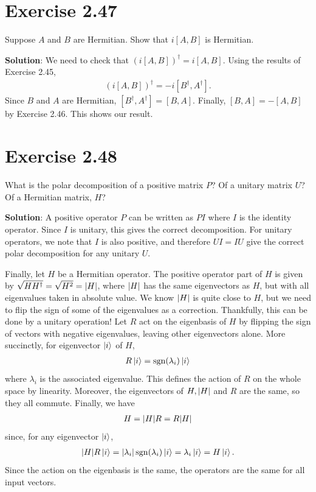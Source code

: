 \documentclass{book}
\begin{document}
\section*{Exercise 2.47}
    Suppose $A$ and $B$ are Hermitian. Show that $i[A, B]$ is Hermitian.
    
    \textbf{Solution}: We need to check that $(i[A,B])^\dagger = i[A,B]$. Using the results of Exercise 2.45,
    \begin{align}
        (i[A,B])^\dagger = -i [B^\dagger, A^\dagger].
    \end{align}
    Since $B$ and $A$ are Hermitian, $[B^\dagger, A^\dagger] = [B,A]$. Finally, $[B,A] = -[A,B]$ by Exercise 2.46. This shows our result.
    
\section*{Exercise 2.48}
    What is the polar decomposition of a positive matrix $P$? Of a unitary matrix $U$? Of a Hermitian matrix, $H$?
    
    \textbf{Solution}: A positive operator $P$ can be written as $P I$ where $I$ is the identity operator. Since $I$ is unitary, this gives the correct decomposition. For unitary operators, we note that $I$ is also positive, and therefore $U I = I U$ give the correct polar decomposition for any unitary $U$. 
    
    Finally, let $H$ be a Hermitian operator. The positive operator part of $H$ is given by $\sqrt{H H^\dagger} = \sqrt{H^2} = \abs{H}$, where $\abs{H}$ has the same eigenvectors as $H$, but with all eigenvalues taken in absolute value. We know $\abs{H}$ is quite close to $H$, but we need to flip the sign of some of the eigenvalues as a correction. Thankfully, this can be done by a unitary operation! Let $R$ act on the eigenbasis of $H$ by flipping the sign of vectors with negative eigenvalues, leaving other eigenvectors alone. More succinctly, for eigenvector $\ket{i}$ of $H$,
    \begin{align}
        R \ket{i} = \operatorname{sgn}(\lambda_i) \ket{i}
    \end{align}
    where $\lambda_i$ is the associated eigenvalue. This defines the action of $R$ on the whole space by linearity. Moreover, the eigenvectors of $H, \abs{H}$ and $R$ are the same, so they all commute. Finally, we have
    \begin{align}
        H  = \abs{H} R = R \abs{H}
    \end{align}
    since, for any eigenvector $\ket{i}$,
    \begin{align}
        \abs{H} R \ket{i} = \abs{\lambda_i} \operatorname{sgn}(\lambda_i)\ket{i} = \lambda_i \ket{i} = H\ket{i}.
    \end{align}
    Since the action on the eigenbasis is the same, the operators are the same for all input vectors.
    
\end{document}
